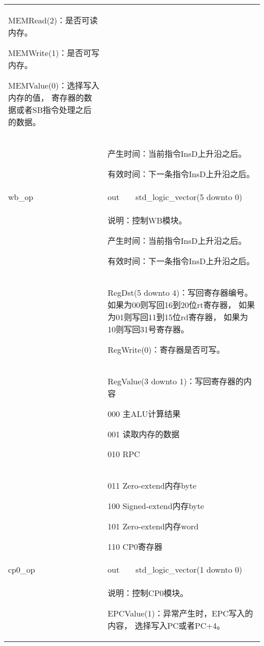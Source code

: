 \begin{tabularx}{\textwidth}{lll}
{                MEMRead(2)：是否可读内存。

                MEMWrite(1)：是否可写内存。

                MEMValue(0)：选择写入内存的值，%
                寄存器的数据或者SB指令处理之后的数据。
            } \\
            &
            \multicolumn{2}{X}{
                产生时间：当前指令InsD上升沿之后。

                有效时间：下一条指令InsD上升沿之后。
            } \\
            \midrule
            wb\_op          & out       & std\_logic\_vector(5 downto 0) \\
            \cmidrule(l){2-3}
            &
            \multicolumn{2}{X}{
                说明：控制WB模块。

                产生时间：当前指令InsD上升沿之后。

                有效时间：下一条指令InsD上升沿之后。 
            } \\
            &
            \multicolumn{2}{X}{
                RegDst(5 downto 4)：写回寄存器编号。
                如果为00则写回16到20位rt寄存器，%
                如果为01则写回11到15位rd寄存器，%
                如果为10则写回31号寄存器。

                RegWrite(0)：寄存器是否可写。
            } \\
            &
            \multicolumn{2}{X}{
                RegValue(3 downto 1)：写回寄存器的内容%

                000 主ALU计算结果

                001 读取内存的数据

                010 RPC
            } \\
            &
            \multicolumn{2}{X}{
                011 Zero-extend内存byte

                100 Signed-extend内存byte

                101 Zero-extend内存word

                110 CP0寄存器
            } \\
            \midrule
            cp0\_op         & out       & std\_logic\_vector(1 downto 0) \\
            \cmidrule(l){2-3}
            &
            \multicolumn{2}{X}{
                说明：控制CP0模块。

                EPCValue(1)：异常产生时，EPC写入的内容，%
                选择写入PC或者PC+4。

}
\end{tabularx}
